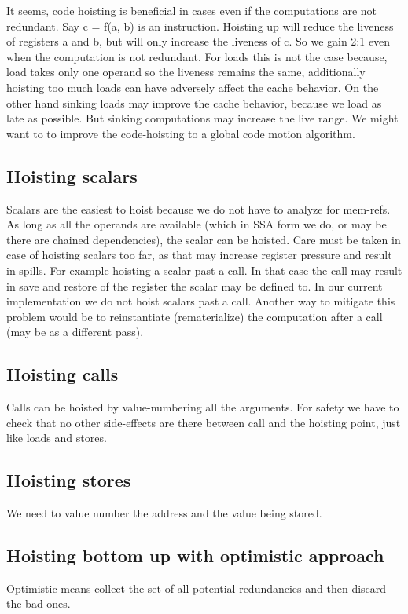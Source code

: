 \begin{section}
It seems, code hoisting is beneficial in cases even if the computations are not redundant.
Say c = f(a, b) is an instruction. Hoisting up will reduce the liveness of registers a and b, but will only increase the liveness of c. So we gain 2:1 even when the computation is not redundant. For loads this is not the case because, load takes only one operand so the liveness remains the same, additionally hoisting too much loads can have adversely affect the cache behavior.
On the other hand sinking loads may improve the cache behavior, because we load as late as possible. But sinking computations may increase the live range.
We might want to to improve the code-hoisting to a global code motion algorithm.

\section{Hoisting scalars}
Scalars are the easiest to hoist because we do not have to analyze for mem-refs. As long as all the
operands are available (which in SSA form we do, or may be there are chained dependencies), the scalar can
be hoisted. Care must be taken in case of hoisting scalars too far, as that may increase register pressure
and result in spills. For example hoisting a scalar past a call. In that case the call may result in
save and restore of the register the scalar may be defined to. In our current implementation
we do not hoist scalars past a call. Another way to mitigate this problem would be to
reinstantiate (rematerialize) the computation after a call (may be as a different pass).

\section{Hoisting calls}
Calls can be hoisted by value-numbering all the arguments. For safety we have to check that no other side-effects are there
between call and the hoisting point, just like loads and stores.

\section{Hoisting stores}
We need to value number the address and the value being stored.

\section{Hoisting bottom up with optimistic approach}
Optimistic means collect the set of all potential redundancies and then discard the bad ones.


\end{section}
